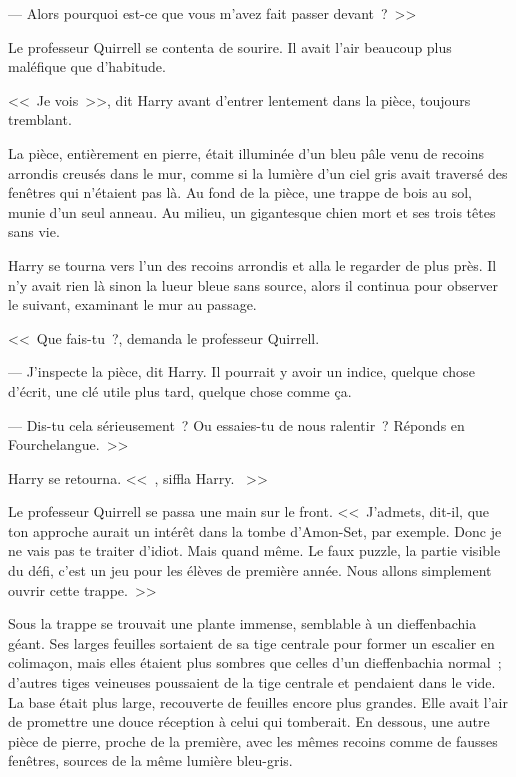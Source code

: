 --- Alors pourquoi est-ce que vous m'avez fait passer devant~?~>>

Le professeur Quirrell se contenta de sourire. Il avait l'air beaucoup plus maléfique que d'habitude.

<<~Je vois~>>, dit Harry avant d'entrer lentement dans la pièce, toujours tremblant.

La pièce, entièrement en pierre, était illuminée d'un bleu pâle venu de recoins arrondis creusés dans le mur, comme si la lumière d'un ciel gris avait traversé des fenêtres qui n'étaient pas là. Au fond de la pièce, une trappe de bois au sol, munie d'un seul anneau. Au milieu, un gigantesque chien mort et ses trois têtes sans vie.

Harry se tourna vers l'un des recoins arrondis et alla le regarder de plus près. Il n'y avait rien là sinon la lueur bleue sans source, alors il continua pour observer le suivant, examinant le mur au passage.

<<~Que fais-tu~?, demanda le professeur Quirrell.

--- J'inspecte la pièce, dit Harry. Il pourrait y avoir un indice, quelque chose d'écrit, une clé utile plus tard, quelque chose comme ça.

--- Dis-tu cela sérieusement~? Ou essaies-tu de nous ralentir~? Réponds en Fourchelangue.~>>

Harry se retourna. <<~, siffla Harry. ~>>

Le professeur Quirrell se passa une main sur le front. <<~J'admets, dit-il, que ton approche aurait un intérêt dans la tombe d'Amon-Set, par exemple. Donc je ne vais pas te traiter d'idiot. Mais quand même. Le faux puzzle, la partie visible du défi, c'est un jeu pour les élèves de première année. Nous allons simplement ouvrir cette trappe.~>>

Sous la trappe se trouvait une plante immense, semblable à un dieffenbachia géant. Ses larges feuilles sortaient de sa tige centrale pour former un escalier en colimaçon, mais elles étaient plus sombres que celles d'un dieffenbachia normal~; d'autres tiges veineuses poussaient de la tige centrale et pendaient dans le vide. La base était plus large, recouverte de feuilles encore plus grandes. Elle avait l'air de promettre une douce réception à celui qui tomberait. En dessous, une autre pièce de pierre, proche de la première, avec les mêmes recoins comme de fausses fenêtres, sources de la même lumière bleu-gris.


